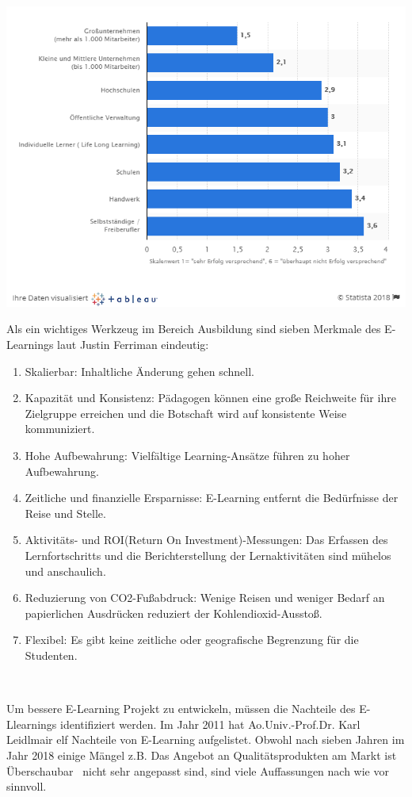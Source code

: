 \includegraphics[width=\textwidth]{images/zielgruppe.png}

Als ein wichtiges Werkzeug im Bereich Ausbildung sind sieben Merkmale des E-Learnings laut Justin Ferriman \citep{6} eindeutig:

\begin{enumerate}
\item Skalierbar: Inhaltliche Änderung gehen schnell. 
\item Kapazität und Konsistenz: Pädagogen können eine große Reichweite für ihre Zielgruppe erreichen und die Botschaft wird auf konsistente Weise kommuniziert.
\item Hohe Aufbewahrung: Vielfältige Learning-Ansätze führen zu hoher Aufbewahrung.
\item Zeitliche und finanzielle Ersparnisse: E-Learning entfernt die Bedürfnisse der Reise und Stelle.
\item Aktivitäts- und ROI(Return On Investment)-Messungen: Das Erfassen des Lernfortschritts und die Berichterstellung der Lernaktivitäten sind mühelos und anschaulich.
\item Reduzierung von CO2-Fußabdruck: Wenige Reisen und weniger Bedarf an papierlichen Ausdrücken reduziert der Kohlendioxid-Ausstoß.
\item Flexibel: Es gibt keine zeitliche oder geografische Begrenzung für die Studenten.
\end{enumerate}\

Um bessere E-Learning Projekt zu entwickeln, müssen die Nachteile des E-Llearnings identifiziert werden. Im Jahr 2011 hat Ao.Univ.-Prof.Dr. Karl Leidlmair\citep{7} elf Nachteile von E-Learning aufgelistet. Obwohl nach sieben Jahren im Jahr 2018 einige Mängel z.B. \glqq Das Angebot an Qualitätsprodukten am Markt ist Überschaubar \grqq\ nicht sehr angepasst sind, sind viele Auffassungen nach wie vor sinnvoll.


